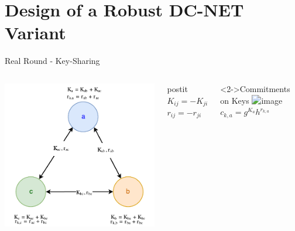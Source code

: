 \section{Design of a Robust DC-NET Variant}



\begin{frame}{Real Round - Key-Sharing}
    \begin{columns}[c]
            \hspace{-0.9cm}
            \includegraphics[scale=.6]{images/keys-sharing.pdf}
            \vspace{.2cm}
            \centering
            \begin{beamercolorbox}[sep=.5em,wd=3cm,center]{postit}
                $K_{ij} = -K_{ji}$\\
                $r_{ij} = -r_{ji}$
            \end{beamercolorbox}
            \begin{block}<2->{Commitments on Keys}
                    \centering
                    \includegraphics<2-2>[scale=0.5]{images/commitment.png}
                    {\centering
                    $c_{k,a} = g^{K_a} h^{r_{k,a}}$\\
}
\end{block}
\end{columns}
\end{frame}
